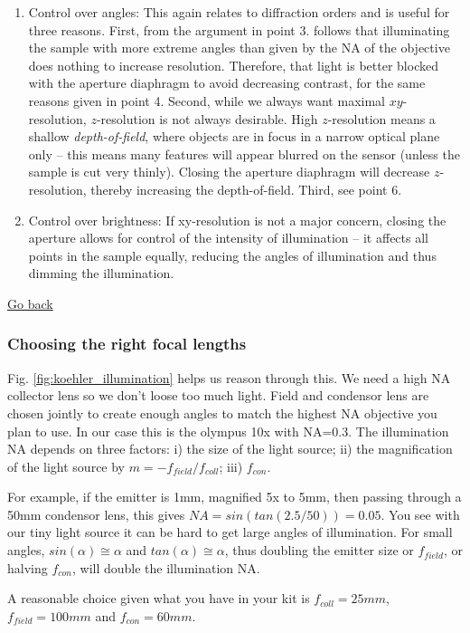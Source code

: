 \documentclass[a4paper]{report}
\begin{document}
\begin{enumerate}
	    \item Control over angles: This again relates to diffraction orders and is useful for three reasons. First, from the argument in point 3. follows that illuminating the sample with more extreme angles than given by the NA of the objective does nothing to increase resolution. Therefore, that light is better blocked with the aperture diaphragm to avoid decreasing contrast, for the same reasons given in point 4. Second, while we always want maximal $xy$-resolution, $z$-resolution is not always desirable. High $z$-resolution means a shallow \emph{depth-of-field}, where objects are in focus in a narrow optical plane only -- this means many features will appear blurred on the sensor (unless the sample is cut very thinly). Closing the aperture diaphragm will decrease $z$-resolution, thereby increasing the depth-of-field. Third, see point 6.
	    \item Control over brightness: If xy-resolution is not a major concern, closing the aperture allows for control of the intensity of illumination -- it affects all points in the sample equally, reducing the angles of illumination and thus dimming the illumination.
	\end{enumerate}

    \noindent
    \hyperlink{hintBack-illumination}{Go back}
    
    
	\subsubsection{Choosing the right focal lengths}
	Fig. \ref{fig:koehler_illumination} helps us reason through this. We need a high NA collector lens so we don't loose too much light. Field and condensor lens are chosen jointly to create enough angles to match the highest NA objective you plan to use. In our case this is the olympus 10x with NA=0.3. The illumination NA depends on three factors: i) the size of the light source; ii) the magnification of the light source by $m=-f_{field}/f_{coll}$; iii) $f_{con}$. 
	
	For example, if the emitter is 1mm, magnified 5x to 5mm, then passing through a 50mm condensor lens, this gives $NA=sin(tan(2.5/50))=0.05$. You see with our tiny light source it can be hard to get large angles of illumination. For small angles, $sin(\alpha)\cong\alpha$ and $tan(\alpha)\cong\alpha$, thus doubling the emitter size or $f_{field}$, or halving $f_{con}$, will double the illumination NA.
	
	A reasonable choice given what you have in your kit is $f_{coll}=25mm$, $f_{field}=100mm$ and $f_{con}=60mm$.
\end{document}
